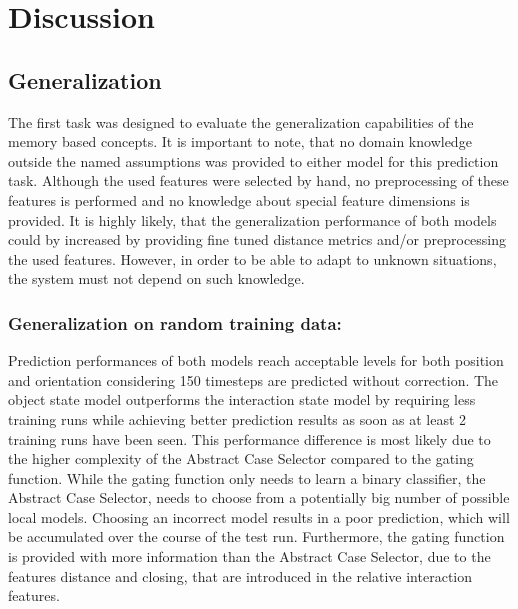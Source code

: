 \chapter{Discussion \label{chap:discussion}}

\section{Generalization}

The first task was designed to evaluate the generalization capabilities of the memory based concepts. It is important to note, that no domain knowledge outside the named assumptions was provided to either model for this prediction task. Although the used features were selected by hand, no preprocessing of these features is performed and no knowledge about special feature dimensions is provided. It is highly likely, that the generalization performance of both models could by increased by providing fine tuned distance metrics and/or preprocessing the used features.
However, in order to be able to adapt to unknown situations, the system must not depend on such knowledge.

\subsection{Generalization on random training data:}

Prediction performances of both models reach acceptable levels for both position and orientation considering 150 timesteps are predicted without correction. 
The object state model outperforms the interaction state model by requiring less training runs while achieving better prediction results as soon as at least 2 training runs have been seen.
This performance difference is most likely due to the higher complexity of the Abstract Case Selector compared to the gating function. While the gating function only needs to learn a binary classifier, the Abstract Case Selector, needs to choose from a potentially big number of possible local models. Choosing an incorrect model results in a poor prediction, which will be accumulated over the course of the test run. Furthermore, the gating function is provided with more information than the Abstract Case Selector, due to the features distance and closing, that are introduced in the relative interaction features. 

